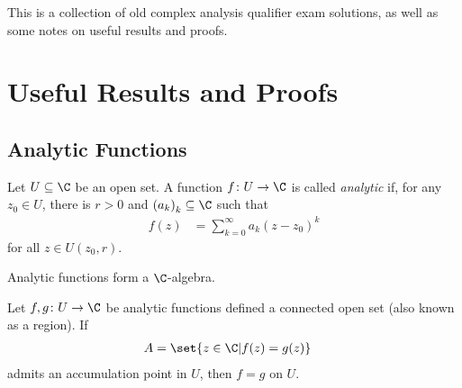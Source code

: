 \documentclass[10pt]{mypackage}
\begin{document}
\RaggedRight
This is a collection of old complex analysis qualifier exam solutions, as well as some notes on useful results and proofs.
\section{Useful Results and Proofs}%
\subsection{Analytic Functions}%
\begin{definition}
  Let $U\subseteq \C$ be an open set. A function $f\colon U\rightarrow \C$ is called \textit{analytic} if, for any $z_0\in U$, there is $r > 0$ and $\left( a_k \right)_k\subseteq \C$ such that
  \begin{align*}
    f(z) &= \sum_{k=0}^{\infty}a_k\left( z-z_0 \right)^{k}
  \end{align*}
  for all $z\in U\left( z_0,r \right)$.
\end{definition}
Analytic functions form a $\C$-algebra.
\begin{theorem}
  Let $f,g\colon U\rightarrow \C$ be analytic functions defined a connected open set (also known as a region). If
  \begin{align*}
    A &= \set{z\in \C | f(z) = g(z)}
  \end{align*}
  admits an accumulation point in $U$, then $f = g$ on $U$.
\end{theorem}
\end{document}
